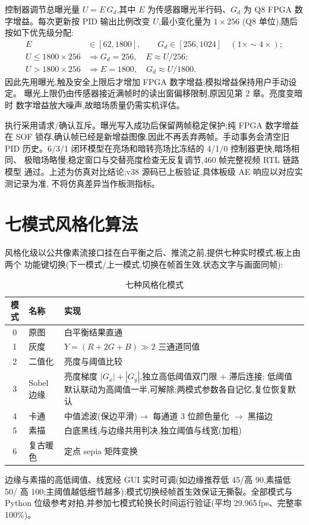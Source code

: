 控制器调节总曝光量 $U=E\,G_d$,其中 $E$ 为传感器曝光半行码、$G_d$ 为 Q8
FPGA 数字增益。每次更新按 PID 输出比例改变 $U$,最小变化量为 $1\times256$
(Q8 单位),随后按如下优先级分配:
\begin{align*}
E&\in[62,1800],\qquad G_d\in[256,1024]\quad(1\times\sim4\times);\\
U\le1800\times256&\Rightarrow G_d=256,\quad E\approx U/256;\\
U>1800\times256&\Rightarrow E=1800,\quad G_d\approx U/1800.
\end{align*}
因此先用曝光,触及安全上限后才增加 FPGA 数字增益;模拟增益保持用户手动设定。
曝光上限仍由传感器接近满帧时的读出窗偏移限制,原因见第 2 章。亮度变暗时
数字增益放大噪声,故暗场质量仍需实机评估。

执行采用请求/确认互斥。曝光写入成功后保留两帧稳定保护;纯 FPGA 数字增益在
SOF 锁存,确认帧已经是新增益图像,因此不再丢弃两帧。手动事务会清空旧 PID
历史。6/3/1 闭环模型在亮场和暗转亮场比冻结的 4/1/0 控制器更快,暗场相同、
极暗场略慢;稳定窗口与交替亮度检查无反复调节,460 帧完整视频 RTL 链路模型
通过。上述为仿真对比结论;v38 源码已上板验证,具体板级 AE 响应以对应实测记录为准,
不将仿真差异当作板测指标。
\section{七模式风格化算法}

风格化级以公共像素流接口挂在白平衡之后、推流之前,提供七种实时模式,板上由两个
功能键切换(下一模式/上一模式,切换在帧首生效,状态文字与画面同帧):

\begin{table}[h!]\centering\small
\caption{七种风格化模式}
\begin{tabular}{clp{9.8cm}}
\toprule
模式 & 名称 & 实现 \\
\midrule
0 & 原图 & 白平衡结果直通 \\
1 & 灰度 & $Y=(R+2G+B)\gg2$ 三通道同值 \\
2 & 二值化 & 亮度与阈值比较 \\
3 & Sobel 边缘 & 亮度梯度 $|G_x|+|G_y|$,独立高低阈值双门限 + 滞后连接;
低阈值默认联动为高阈值一半,可解除;两模式参数各自记忆,复位恢复默认 \\
4 & 卡通 & 中值滤波(保边平滑)$\to$ 每通道 3 位颜色量化 $\to$ 黑描边 \\
5 & 素描 & 白底黑线,与边缘共用判决,独立阈值与线宽(加粗) \\
6 & 复古暖色 & 定点 sepia 矩阵变换 \\
\bottomrule
\end{tabular}
\end{table}

边缘与素描的高低阈值、线宽经 GUI 实时可调(如边缘推荐低 45/高 90,素描低 50/
高 100;主阈值越低细节越多);模式切换经帧首生效保证无撕裂。全部模式与 Python
位级参考对拍,并参加七模式轮换长时间运行验证(平均 29.965\,fps、完整率 100\%)。
